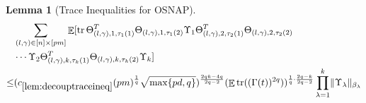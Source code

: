 \documentclass[11pt]{amsart}
\numberwithin{equation}{section}
\numberwithin{equation}{section}
\DeclareMathOperator{\E}{\mathbb{E}}
\DeclareMathOperator*{\tr}{tr}
\DeclarePairedDelimiter{\norm}{\lVert}{\rVert}
\newtheorem{lemma}[theorem]{Lemma}
\theoremstyle{remark}
\theoremstyle{definition}
\begin{document}
\begin{lemma} [Trace Inequalities for OSNAP]
\begin{equation}\label{eq:traceineq}
\begin{aligned}
    &\sum_{(l,\gamma) \in [n] \times [pm]} \E[ \tr \Theta_{(l,\gamma), 1, \tau_1(1)}^T\Theta_{(l,\gamma), 1, \tau_1(2)}
	\Upsilon_1\Theta_{(l,\gamma), 2, \tau_2(1)}^T\Theta_{(l,\gamma), 2, \tau_2(2)} \\&\cdots
	\Upsilon_2\Theta_{(l,\gamma), k, \tau_k(1)}^T\Theta_{(l,\gamma), k, \tau_k(2)}\Upsilon_k]  \\ \le &
       (c_{\ref*{lem:decouptraceineq}}(pm)^{\frac{1}{q}}\sqrt{\max\{pd,q\}})^{\frac{2qk-4q}{2q-2}} (\E \tr((\Gamma(t))^{2q}))^{\frac{1}{q} \cdot \frac{2q-k}{2q-2}} \prod \limits_{\lambda=1}^k \norm{\Upsilon_{\lambda}}_{\beta_{\lambda}}
\end{aligned}
\end{equation}
\end{lemma}
\end{document}
